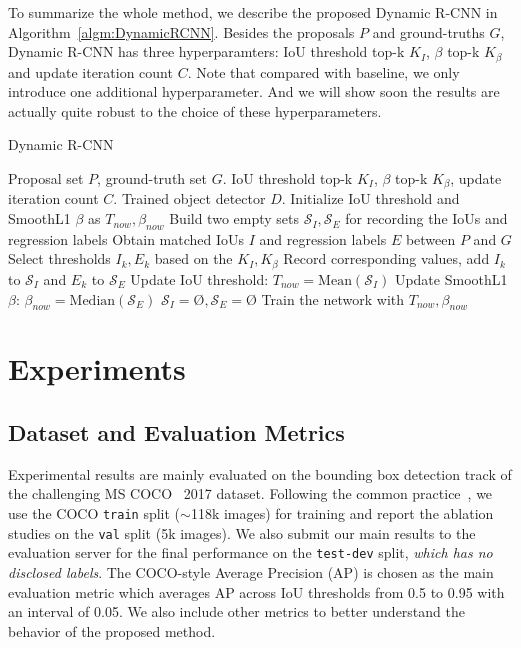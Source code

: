\documentclass[runningheads]{llncs}
\begin{document}
To summarize the whole method, we describe the proposed Dynamic R-CNN in Algorithm~\ref{algm:DynamicRCNN}. Besides the proposals $P$ and ground-truths $G$, Dynamic R-CNN has three hyperparamters: IoU threshold top-k $K_I$, $\beta$ top-k $K_\beta$ and update iteration count $C$. Note that compared with baseline, we only introduce one additional hyperparameter. And we will show soon the results are actually quite robust to the choice of these hyperparameters.


\begin{algorithm}[!t]
    \caption{Dynamic R-CNN}
    \begin{algorithmic}[1]
    \Require
        \Statex Proposal set $P$, ground-truth set $G$.
        \Statex IoU threshold top-k $K_{I}$, $\beta$ top-k $K_\beta$, update iteration count $C$.
    \Ensure
        \Statex Trained object detector $D$.
    \State Initialize IoU threshold and SmoothL1 $\beta$ as $T_{now}, \beta_{now}$
    \State Build two empty sets $\mathcal{S}_{I}, \mathcal{S}_{E}$ for recording the IoUs and regression labels
        \State Obtain matched IoUs $I$ and regression labels $E$ between $P$ and $G$
        \State Select thresholds $I_k, E_k$ based on the $K_{I}, K_\beta$
        \State Record corresponding values, add $I_k$ to $\mathcal{S}_{I}$ and $E_k$ to $\mathcal{S}_{E}$
            \State Update IoU threshold: $T_{now}=\text{Mean}(\mathcal{S}_{I})$
            \State Update SmoothL1 $\beta$: $\beta_{now}=\text{Median}(\mathcal{S}_{E})$
            \State $\mathcal{S}_{I}=\text{\O}, \mathcal{S}_{E}=\text{\O}$
        \EndIf
        \State Train the network with $T_{now}, \beta_{now}$
    \EndFor
    \State {}
    \end{algorithmic}
    \label{algm:DynamicRCNN}
\end{algorithm}

\section{Experiments}


\subsection{Dataset and Evaluation Metrics}

Experimental results are mainly evaluated on the bounding box detection track of the challenging MS COCO~\cite{COCO} 2017 dataset. Following the common practice~\cite{FocalLoss,MaskRCNN}, we use the COCO \texttt{train} split ($\sim$118k images) for training and report the ablation studies on the \texttt{val} split (5k images). We also submit our main results to the evaluation server for the final performance on the \texttt{test-dev} split, \textit{which has no disclosed labels}. The COCO-style Average Precision (AP) is chosen as the main evaluation metric which averages AP across IoU thresholds from 0.5 to 0.95 with an interval of 0.05. We also include other metrics to better understand the behavior of the proposed method.
\end{document}
